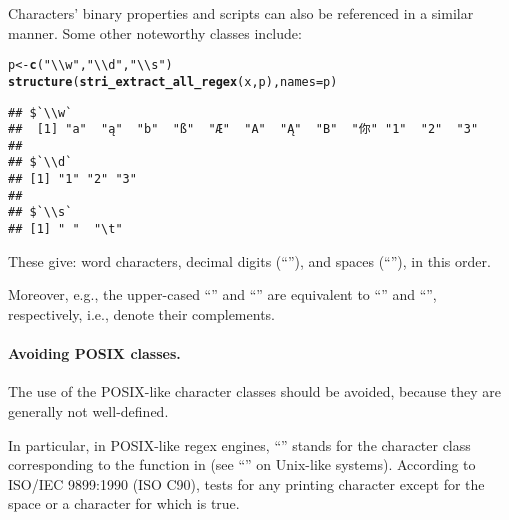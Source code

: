 \documentclass[nojss]{jss}\usepackage[]{graphicx}\usepackage[]{xcolor}
\makeatletter
\newcommand{\hlstr}[1]{\textcolor[rgb]{0.192,0.494,0.8}{#1}}%
\newcommand{\hlstd}[1]{\textcolor[rgb]{0.345,0.345,0.345}{#1}}%
\newcommand{\hlkwb}[1]{\textcolor[rgb]{0.69,0.353,0.396}{#1}}%
\newcommand{\hlkwc}[1]{\textcolor[rgb]{0.333,0.667,0.333}{#1}}%
\newcommand{\hlkwd}[1]{\textcolor[rgb]{0.737,0.353,0.396}{\textbf{#1}}}%
\newenvironment{kframe}{%
 \def\at@end@of@kframe{}%
 \ifinner\ifhmode%
  \def\at@end@of@kframe{\end{minipage}}%
  \begin{minipage}{\columnwidth}%
 \fi\fi%
 \def\FrameCommand##1{\hskip\@totalleftmargin \hskip-\fboxsep
 \colorbox{shadecolor}{##1}\hskip-\fboxsep
     \hskip-\linewidth \hskip-\@totalleftmargin \hskip\columnwidth}%
 \MakeFramed {\advance\hsize-\width
   \@totalleftmargin\z@ \linewidth\hsize
   \@setminipage}}%
 {\par\unskip\endMakeFramed%
 \at@end@of@kframe}
\newenvironment{knitrout}{}{} %
\makeatother
\begin{document}
Characters' binary properties and scripts can also be referenced in a similar manner.
Some other noteworthy classes include:

\begin{knitrout}
\color{fgcolor}\begin{kframe}
\begin{alltt}
\hlstd{p} \hlkwb{<-} \hlkwd{c}\hlstd{(}\hlstr{"\textbackslash{}\textbackslash{}w"}\hlstd{,} \hlstr{"\textbackslash{}\textbackslash{}d"}\hlstd{,} \hlstr{"\textbackslash{}\textbackslash{}s"}\hlstd{)}
\hlkwd{structure}\hlstd{(}\hlkwd{stri_extract_all_regex}\hlstd{(x, p),} \hlkwc{names}\hlstd{=p)}
\end{alltt}
\begin{verbatim}
## $`\\w`
##  [1] "a"  "ą"  "b"  "ß"  "Æ"  "A"  "Ą"  "B"  "你" "1"  "2"  "3" 
## 
## $`\\d`
## [1] "1" "2" "3"
## 
## $`\\s`
## [1] " "  "\t"
\end{verbatim}
\end{kframe}
\end{knitrout}

These give: word characters, decimal digits (``''),
and spaces (``''),
in this order.

Moreover, e.g., the upper-cased ``'' and
``'' are equivalent to
``'' and
``\code{[\^{}\textbackslash{}w]}'', respectively, i.e.,
denote their complements.




\paragraph{Avoiding POSIX classes.}
The use of the POSIX-like character classes should be avoided,
because they are generally not well-defined.

In particular, in POSIX-like regex engines, ``\code{[:punct:]}''
stands for the character class corresponding to the 
function in  (see ``'' on Unix-like systems).
According to ISO/IEC 9899:1990 (ISO C90),  tests for
any printing character except for the space or a character for which 
is true.
\end{document}

